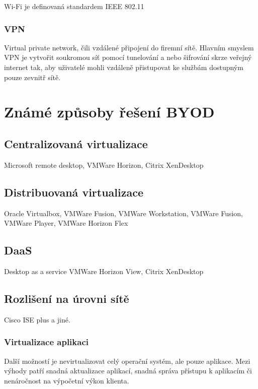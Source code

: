  Wi-Fi je definovaná standardem IEEE 802.11
 
 \subsubsection{VPN} 
 Virtual private network, čili vzdálené připojení do firemní sítě. Hlavním smyslem VPN je vytvořit soukromou síť pomocí tunelování a nebo šifrování skrze veřejný internet tak, aby uživatelé mohli vzdáleně přistupovat ke službám dostupným pouze zevnitř sítě.
 
 
 
 
 
 \section{Známé způsoby řešení BYOD}

 
 \subsection{Centralizovaná virtualizace}
 Microsoft remote desktop, VMWare Horizon, Citrix XenDesktop
 
 \subsection{Distribuovaná virtualizace}
 Oracle Virtualbox, VMWare Fusion, VMWare Workstation, VMWare Fusion, VMWare Player, VMWare Horizon Flex
 
 
 \subsection{DaaS}
 Desktop as a service
 VMWare Horizon View, Citrix XenDesktop
 
 \subsection{Rozlišení na úrovni sítě}
 Cisco ISE plus a jiné. 
 
 
 \subsubsection{Virtualizace aplikaci}
 Další možností je nevirtualizovat celý operační systém, ale pouze aplikace. Mezi výhody patří snadná aktualizace aplikací, snadná správa přístupu k aplikacím či nenáročnost na výpočetní výkon klienta.
 
